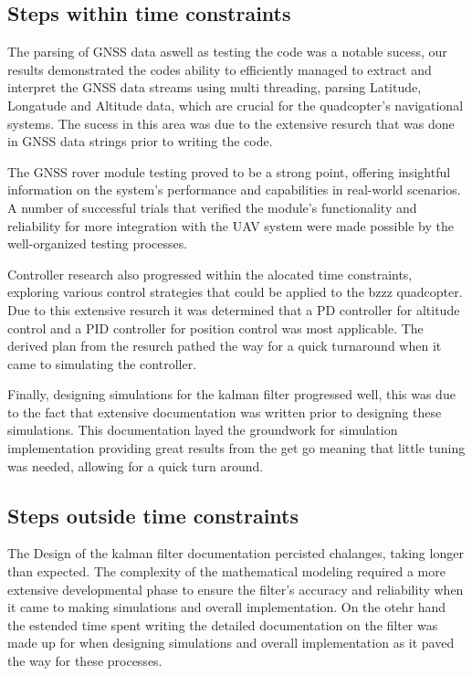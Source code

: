 \documentclass{article}
\begin{document}
\subsection*{Steps within time constraints}
The parsing of GNSS data aswell as testing the code was a notable sucess, our
results demonstrated the codes ability to efficiently managed to extract and
interpret the GNSS data streams using multi threading, parsing Latitude,
Longatude and  Altitude data, which are crucial for the quadcopter's
navigational systems. The sucess in this area was due to the extensive resurch
that was done in GNSS data strings prior to writing the code.

The GNSS rover module testing proved to be a strong point, offering insightful
information on the system's performance and capabilities in real-world
scenarios. A number of successful trials that verified the module's
functionality and reliability for more integration with the UAV system were
made possible by the well-organized testing processes.

Controller research also progressed within the alocated time constraints,
exploring various control strategies that could be applied to the bzzz
quadcopter. Due to this extensive resurch it was determined that a PD controller
for altitude control and a PID controller for position control was most
applicable. The derived plan from the resurch pathed the way for a quick
turnaround when it came to simulating the controller. 

Finally, designing simulations for the kalman filter progressed well, this was
due to the fact that extensive documentation was written prior to designing
these simulations. This documentation layed the groundwork for simulation
implementation providing great results from the get go meaning that little
tuning was needed, allowing for a quick turn around. 

\subsection*{Steps outside time constraints}
The Design of the kalman filter documentation percisted chalanges, taking longer
than expected. The complexity of the mathematical modeling required a more
extensive developmental phase to ensure the filter's accuracy and reliability
when it came to making simulations and overall implementation. On the otehr hand
the estended time spent writing the detailed documentation on the filter was
made up for when designing simulations and overall implementation as it paved
the way for these processes. 
\end{document}
